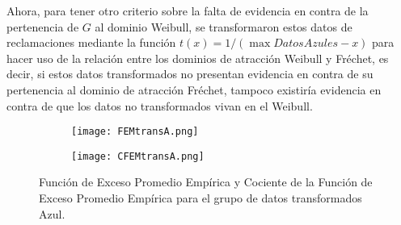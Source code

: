 \documentclass[10.5pt,notitlepage]{article}
\theoremstyle{plain}
\begin{document}
Ahora, para tener otro criterio sobre la falta de evidencia en contra de la pertenencia de \(G\) al dominio Weibull, se transformaron estos datos de reclamaciones mediante la función $t(x) = 1/(\max{DatosAzules} - x)$ para hacer uso de la relación entre los dominios de atracción Weibull y Fréchet, es decir, si estos datos transformados no presentan evidencia en contra de su pertenencia al dominio de atracción Fréchet, tampoco existiría evidencia en contra de que los datos no transformados vivan en el Weibull.
\begin{figure}[!tbp]
  \begin{subfigure}[b]{0.44\textwidth}
    \texttt{[image: FEMtransA.png]}
  \end{subfigure}
  \hfill
  \begin{subfigure}[b]{0.44\textwidth}
    \texttt{[image: CFEMtransA.png]}
  \end{subfigure}
  \caption{Función de Exceso Promedio Empírica y Cociente de la Función de Exceso Promedio Empírica para el grupo de datos transformados Azul.}
\label{1.7}
\end{figure}
\end{document}
